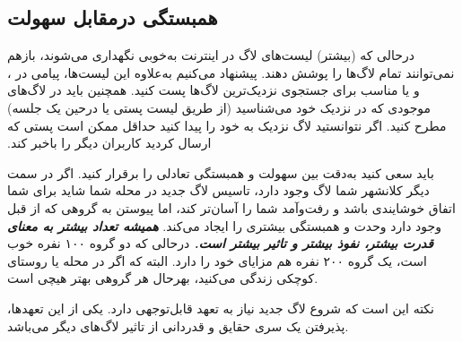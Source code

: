 \subsection{همبستگی درمقابل سهولت}

درحالی که (بیشتر) لیست‌های لاگ در اینترنت  ‫به‌خوبی نگهداری می‌شوند،
بازهم نمی‌توانند تمام لاگ‌ها را پوشش دهند. پیشنهاد می‌کنیم به‌علاوه این لیست‌ها، پیامی در
،
و یا
مناسب برای جستجوی نزدیک‌ترین لاگ‌ها پست کنید.
همچنین باید در لاگ‌های موجودی که در نزدیک خود می‌شناسید
(از طریق لیست پستی یا درحین یک جلسه) مطرح کنید.
اگر نتوانستید لاگ نزدیک به خود را پیدا کنید حداقل ممکن است
پستی که ارسال کردید کاربران دیگر را باخبر کند.


باید سعی کنید به‌دقت بین سهولت و همبستگی تعادلی را برقرار کنید.
اگر در سمت دیگر کلانشهر شما لاگ وجود دارد، تاسیس لاگ جدید
در محله شما شاید برای شما اتفاق خوشایندی باشد و رفت‌وآمد شما را آسان‌تر کند،
اما پیوستن به گروهی که از قبل وجود دارد وحدت و همبستگی بیشتری را ایجاد می‌کند.
{\bfseries {\itshape
همیشه تعداد بیشتر به معنای قدرت بیشتر، نفوذ بیشتر و تاثیر بیشتر است.
}}
درحالی که دو گروه ۱۰۰ نفره خوب است، یک گروه ۲۰۰ نفره هم مزایای خود را دارد.
البته که اگر در محله یا روستای کوچکی زندگی می‌کنید، بهرحال هر گروهی بهتر هیچی است.

نکته این است که شروع لاگ جدید نیاز به تعهد قابل‌توجهی دارد.
یکی از این تعهد‌ها، پذیرفتن یک سری حقایق و قدردانی از تاثیر لاگ‌های
دیگر می‌باشد.
